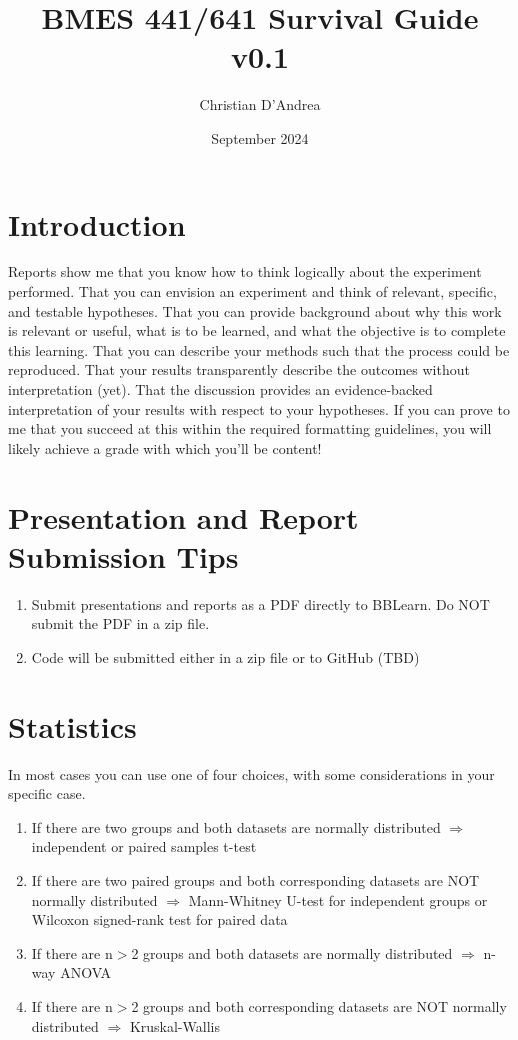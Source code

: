 \documentclass{article}
\title{BMES 441/641 Survival Guide v0.1}
\author{Christian D'Andrea }
\date{September 2024}
\begin{document}
\maketitle

\section{Introduction}
Reports show me that you know how to think logically about the experiment performed. That you can envision an experiment and think of relevant, specific, and testable hypotheses. That you can provide background about why this work is relevant or useful, what is to be learned, and what the objective is to complete this learning. That you can describe your methods such that the process could be reproduced. That your results transparently describe the outcomes without interpretation (yet). That the discussion provides an evidence-backed interpretation of your results with respect to your hypotheses. If you can prove to me that you succeed at this within the required formatting guidelines, you will likely achieve a grade with which you'll be content!

\section{Presentation and Report Submission Tips}
\begin{enumerate}
\item Submit presentations and reports as a PDF directly to BBLearn. Do NOT submit the PDF in a zip file.
\item Code will be submitted either in a zip file or to GitHub (TBD)
\end{enumerate}

\section{Statistics}
In most cases you can use one of four choices, with some considerations in your specific case.

\begin{enumerate}
\item If there are two groups and both datasets are normally distributed $\Rightarrow$ independent or paired samples t-test
\item If there are two paired groups and both corresponding datasets are NOT normally distributed $\Rightarrow$ Mann-Whitney U-test for independent groups or Wilcoxon signed-rank test for paired data 
\item If there are n$>$2 groups and both datasets are normally distributed $\Rightarrow$ n-way ANOVA
\item If there are n$>$2 groups and both corresponding datasets are NOT normally distributed $\Rightarrow$ Kruskal-Wallis
\end{enumerate}
\end{document}
